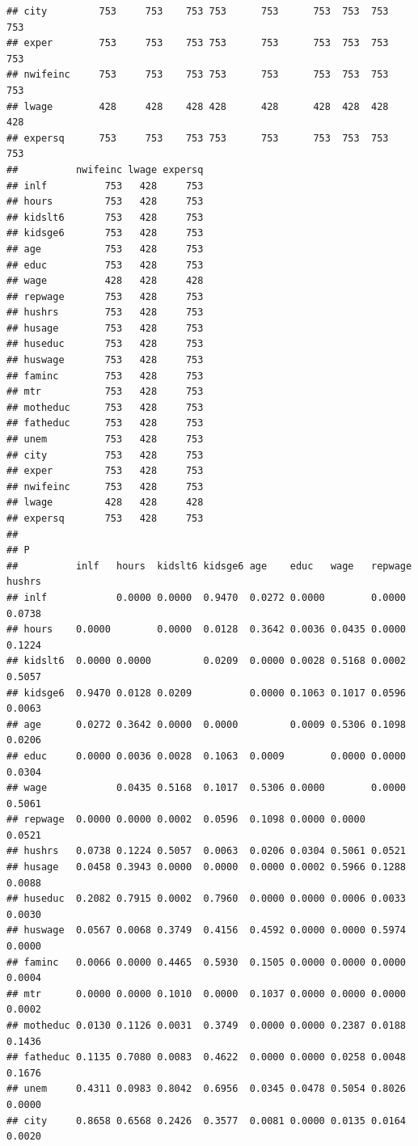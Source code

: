 \documentclass[]{book}
\begin{document}
\begin{verbatim}
## city         753     753    753 753      753      753  753  753   753
## exper        753     753    753 753      753      753  753  753   753
## nwifeinc     753     753    753 753      753      753  753  753   753
## lwage        428     428    428 428      428      428  428  428   428
## expersq      753     753    753 753      753      753  753  753   753
##          nwifeinc lwage expersq
## inlf          753   428     753
## hours         753   428     753
## kidslt6       753   428     753
## kidsge6       753   428     753
## age           753   428     753
## educ          753   428     753
## wage          428   428     428
## repwage       753   428     753
## hushrs        753   428     753
## husage        753   428     753
## huseduc       753   428     753
## huswage       753   428     753
## faminc        753   428     753
## mtr           753   428     753
## motheduc      753   428     753
## fatheduc      753   428     753
## unem          753   428     753
## city          753   428     753
## exper         753   428     753
## nwifeinc      753   428     753
## lwage         428   428     428
## expersq       753   428     753
## 
## P
##          inlf   hours  kidslt6 kidsge6 age    educ   wage   repwage hushrs
## inlf            0.0000 0.0000  0.9470  0.0272 0.0000        0.0000  0.0738
## hours    0.0000        0.0000  0.0128  0.3642 0.0036 0.0435 0.0000  0.1224
## kidslt6  0.0000 0.0000         0.0209  0.0000 0.0028 0.5168 0.0002  0.5057
## kidsge6  0.9470 0.0128 0.0209          0.0000 0.1063 0.1017 0.0596  0.0063
## age      0.0272 0.3642 0.0000  0.0000         0.0009 0.5306 0.1098  0.0206
## educ     0.0000 0.0036 0.0028  0.1063  0.0009        0.0000 0.0000  0.0304
## wage            0.0435 0.5168  0.1017  0.5306 0.0000        0.0000  0.5061
## repwage  0.0000 0.0000 0.0002  0.0596  0.1098 0.0000 0.0000         0.0521
## hushrs   0.0738 0.1224 0.5057  0.0063  0.0206 0.0304 0.5061 0.0521        
## husage   0.0458 0.3943 0.0000  0.0000  0.0000 0.0002 0.5966 0.1288  0.0088
## huseduc  0.2082 0.7915 0.0002  0.7960  0.0000 0.0000 0.0006 0.0033  0.0030
## huswage  0.0567 0.0068 0.3749  0.4156  0.4592 0.0000 0.0000 0.5974  0.0000
## faminc   0.0066 0.0000 0.4465  0.5930  0.1505 0.0000 0.0000 0.0000  0.0004
## mtr      0.0000 0.0000 0.1010  0.0000  0.1037 0.0000 0.0000 0.0000  0.0002
## motheduc 0.0130 0.1126 0.0031  0.3749  0.0000 0.0000 0.2387 0.0188  0.1436
## fatheduc 0.1135 0.7080 0.0083  0.4622  0.0000 0.0000 0.0258 0.0048  0.1676
## unem     0.4311 0.0983 0.8042  0.6956  0.0345 0.0478 0.5054 0.8026  0.0000
## city     0.8658 0.6568 0.2426  0.3577  0.0081 0.0000 0.0135 0.0164  0.0020

\end{verbatim}
\end{document}
